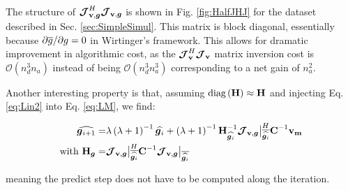 The structure of $\bm{\mathcal{J}}_{\textbf{v},\bm{g}}^H\bm{\mathcal{J}}_{\textbf{v},\bm{g}}$ is shown in Fig. \ref{fig:HalfJHJ} for
the dataset described in Sec. \ref{sec:SimpleSimul}. This
matrix is block diagonal, essentially because 
$\partial \overline{g}/\partial g=0$ in Wirtinger's framework. This allows
for dramatic improvement in algorithmic cost, as the $\bm{\mathcal{J}}_{\textbf{v}}^H\bm{\mathcal{J}}_{\textbf{v}}$ matrix
inversion cost is $\mathcal{O}\left(n_d^3n_a\right)$ instead of being
$\mathcal{O}\left(n_d^3n_a^3\right)$ corresponding to a net gain of $n^2_a$.

Another interesting property is that, assuming
$\text{diag}\left(\textbf{H}\right)\approx\textbf{H}$ and injecting Eq. \ref{eq:Lin2}
into Eq. \ref{eq:LM}, we find:

\def\Fact{\left(\lambda+1\right)^{-1}}
\def\ThisJ{\JVg\big|_{\conj{\widehat{\g_{i}}}}}
\begin{alignat}{2}
\label{eq:HalfLM}
\widehat{\vec{g}_{i+1}}=&\lambda\Fact\widehat{\vec{g}_{i}}+\Fact\H_{\widehat{\vec{g}_{i}}}^{-1}\ThisJ^H\textbf{C}^{-1}\mathbf{v_m}\\
\text{with }\H_{\vec{g}}=&\ThisJ^H\textbf{C}^{-1}\ThisJ
\end{alignat}

\noindent meaning the predict step does not have to be computed along
the iteration.





